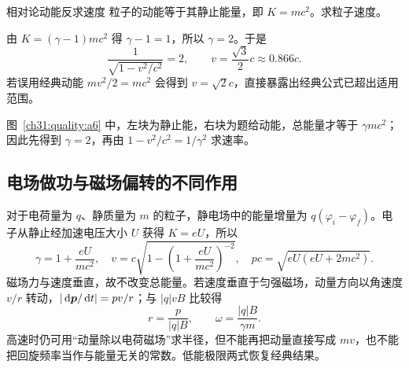 \begin{origexamplebox}{相对论动能反求速度}
粒子的动能等于其静止能量，即 $K=mc^2$。求粒子速度。

\begin{center}\begin{minipage}{.96\linewidth}\centering
{}
\end{minipage}\end{center}
\end{origexamplebox}
\begin{xesolution}
\begin{center}\begin{minipage}{.96\linewidth}\centering
{}
\end{minipage}\end{center}

\ModernAnswerLabel\quad 由 $K=(\gamma-1)mc^2$ 得 $\gamma-1=1$，所以 $\gamma=2$。于是
\[
 \frac1{\sqrt{1-v^2/c^2}}=2,
 \qquad
 \boxed{v=\frac{\sqrt3}{2}c\approx0.866c}.
\]
若误用经典动能 $mv^2/2=mc^2$ 会得到 $v=\sqrt2c$，直接暴露出经典公式已超出适用范围。

图~\ref{ch31:quality:a6} 中，左块为静止能，右块为题给动能，总能量才等于 $\gamma mc^2$；因此先得到 $\gamma=2$，再由 $1-v^2/c^2=1/\gamma^2$ 求速率。
\end{xesolution}


\subsection{电场做功与磁场偏转的不同作用}
对于电荷量为 $q$、静质量为 $m$ 的粒子，静电场中的能量增量为 $q(\varphi_i-\varphi_f)$。电子从静止经加速电压大小 $U$ 获得 $K=eU$，所以
\[
 \gamma=1+\frac{eU}{mc^2},\quad
 v=c\sqrt{1-\left(1+\frac{eU}{mc^2}\right)^{-2}},\quad
 pc=\sqrt{eU(eU+2mc^2)}.
\]
磁场力与速度垂直，故不改变总能量。若速度垂直于匀强磁场，动量方向以角速度 $v/r$ 转动，$|\mathop{}\!\mathrm d\bm{p}/\mathop{}\!\mathrm d t|=pv/r$；与 $|q|vB$ 比较得
\[
 r=\frac p{|q|B},\qquad \omega=\frac{|q|B}{\gamma m}.
\]
高速时仍可用“动量除以电荷磁场”求半径，但不能再把动量直接写成 $mv$，也不能把回旋频率当作与能量无关的常数。低能极限两式恢复经典结果。

